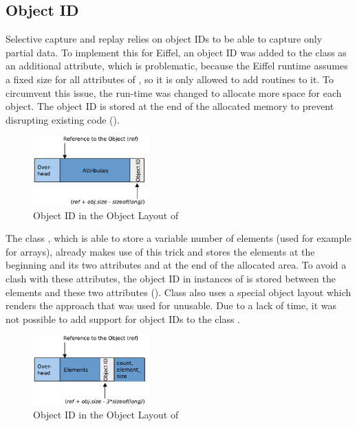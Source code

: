 \subsection{Object ID}
Selective capture and replay relies on object IDs to be able to capture only partial data. To implement this for Eiffel, an object ID was added to the class  as an additional attribute, which is problematic, because the Eiffel runtime assumes a fixed size for all attributes of , so it is only allowed to add routines to it. To circumvent this issue, the run-time was  changed to allocate more space for each object. The object ID is stored at the end of the allocated memory to prevent disrupting existing code ().
\begin{figure}[ht]
  \centering
  \includegraphics[width=0.4\textwidth]{illustrations/any_object_id}
  \caption{Object ID in the Object Layout of }
  \label{fig:any_object_id}
\end{figure}

The class , which is able to store a variable number of elements (used for example for arrays), already makes use of this trick and stores the elements at the beginning and its two attributes  and  at the end of the allocated area. To avoid a clash with these attributes, the object ID in instances of  is stored between the elements and these two attributes (). Class  also uses a special object layout which renders the approach that was used for  unusable. Due to a lack of time, it was not possible to add support for object IDs to the class .
\begin{figure}[ht]
  \centering
  \includegraphics[width=0.4\textwidth]{illustrations/special_object_id}
  \caption{Object ID in the Object Layout of }
  \label{fig:special_object_id}
\end{figure}

